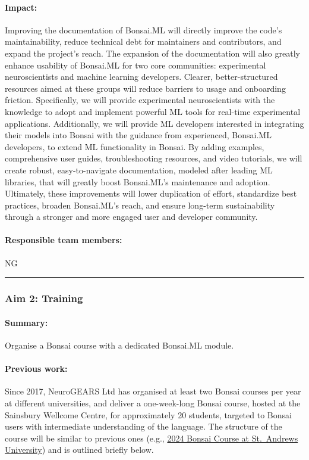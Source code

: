 \paragraph{Impact:} Improving the documentation of Bonsai.ML will directly
improve the code's maintainability, reduce technical debt for maintainers and
contributors, and expand the project's reach. The expansion of the
documentation will also greatly enhance usability of Bonsai.ML for two core
communities: experimental neuroscientists and machine learning developers.
Clearer, better-structured resources aimed at these groups will reduce barriers
to usage and onboarding friction. Specifically, we will provide experimental
neuroscientists with the knowledge to adopt and implement powerful ML tools for
real-time experimental applications. Additionally, we will provide ML
developers interested in integrating their models into Bonsai with the guidance
from experienced, Bonsai.ML developers, to extend ML functionality in Bonsai.
By adding examples, comprehensive user guides, troubleshooting resources, and
video tutorials, we will create robust, easy-to-navigate documentation, modeled
after leading ML libraries, that will greatly boost Bonsai.ML's maintenance and
adoption. Ultimately, these improvements will lower duplication of effort,
standardize best practices, broaden Bonsai.ML's reach, and ensure long-term
sustainability through a stronger and more engaged user and developer
community.

\paragraph{Responsible team members:} NG

\noindent\rule{\textwidth}{1pt}
\subsubsection{Aim 2: Training}
\paragraph{Summary:} Organise a Bonsai course with a dedicated Bonsai.ML module.

\paragraph{Previous work:} Since 2017, NeuroGEARS Ltd has organised at least
two Bonsai courses per year at different universities, and deliver a
one-week-long Bonsai course, hosted at the Sainsbury Wellcome Centre, for
approximately 20 students, targeted to Bonsai users with intermediate
understanding of the language. The structure of the course will be similar to
previous ones (e.g., \href{https://neurogears.org/st-andrews-2024/}{2024 Bonsai
Course at St.~Andrews University}) and is outlined briefly below.

